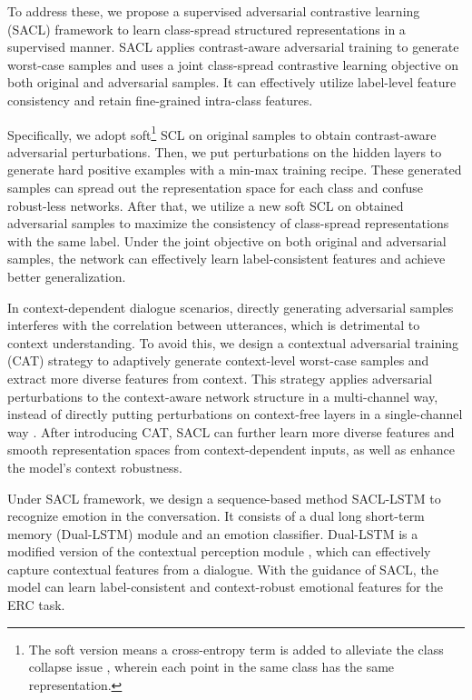 \documentclass[11pt]{article}
\begin{document}
To address these, 
we propose a supervised adversarial contrastive learning (SACL) framework to learn class-spread structured representations in a supervised manner.
SACL applies contrast-aware adversarial training to generate worst-case samples and uses a joint class-spread contrastive learning objective on both original and adversarial samples. It can effectively utilize label-level feature consistency and retain fine-grained intra-class features. 

Specifically, we adopt soft\footnote{The soft version means a cross-entropy term is added to alleviate the class collapse issue \cite{graf2021dissecting}, wherein each point in the same class has the same representation.} 
SCL \citep{gunel2020supervised} on original samples to obtain contrast-aware adversarial perturbations. Then, we put perturbations on the hidden layers to generate hard positive examples with a min-max training recipe. These generated samples can spread out the representation space for each class and confuse robust-less networks.
After that, we utilize a new soft
SCL on obtained adversarial samples to maximize the consistency of class-spread representations with the same label.
Under the joint objective on both original and adversarial samples, the network can effectively learn label-consistent features and achieve better generalization.

In context-dependent dialogue scenarios, directly generating adversarial samples interferes with the correlation between utterances, which is detrimental to context understanding. To avoid this, we design a contextual adversarial training (CAT) strategy to adaptively generate context-level worst-case samples and extract more diverse features from context. This strategy applies adversarial perturbations to the context-aware network structure in a multi-channel way, instead of directly putting perturbations on context-free layers in a single-channel way \cite{DBLP:journals/corr/GoodfellowSS14,DBLP:conf/iclr/MiyatoDG17}.
After introducing CAT, SACL can further learn more diverse features and smooth representation spaces from context-dependent inputs, as well as enhance the model's context robustness.

Under SACL framework, we design a sequence-based method SACL-LSTM to recognize emotion in the conversation. It consists of a dual long short-term memory (Dual-LSTM) module and an emotion classifier. 
Dual-LSTM is a modified version of the contextual perception module \cite{DBLP:conf/acl/HuWH20}, which can effectively capture contextual features from a dialogue.
With the guidance of SACL, the model can learn label-consistent and context-robust emotional features for the ERC task.
\end{document}

